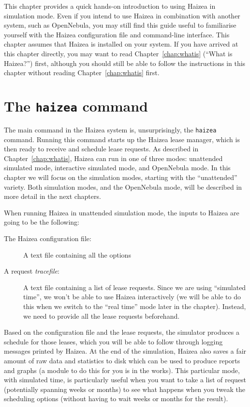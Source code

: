 This chapter provides a quick hands-on introduction to using Haizea in simulation mode. Even if you intend to use Haizea in combination with another system, such as OpenNebula, you may still find this guide useful to familiarise yourself with the Haizea configuration file and command-line interface. This chapter assumes that Haizea is installed on your system. If you have arrived at this chapter directly, you may want to read Chapter~\ref{chap:whatis} (``What is Haizea?'') first, although you should still be able to follow the instructions in this chapter without reading Chapter~\ref{chap:whatis} first.

\section{The \texttt{haizea} command}

The main command in the Haizea system is, unsurprisingly, the \texttt{haizea} command. Running this command starts up the Haizea lease manager, which is then ready to receive and schedule lease requests. As described in Chapter~\ref{chap:whatis}, Haizea can run in one of three modes: unattended simulated mode, interactive simulated mode, and OpenNebula mode. In this chapter we will focus on the simulation modes, starting with the ``unattended'' variety. Both simulation modes, and the OpenNebula mode, will be described in more detail in the next chapters.

When running Haizea in unattended simulation mode, the inputs to Haizea are going to be the following:

\begin{description}
 \item [The Haizea configuration file:] A text file containing all the options
 \item [A request \emph{tracefile}:] A text file containing a list of lease requests. Since we are using ``simulated time'', we won't be able to use Haizea interactively (we will be able to do this when we switch to the ``real time'' mode later in the chapter). Instead, we need to provide all the lease requests beforehand.
\end{description}

Based on the configuration file and the lease requests, the simulator produces a schedule for those leases, which you will be able to follow through logging messages printed by Haizea. At the end of the simulation, Haizea also saves a fair amount of raw data and statistics to disk which can be used to produce reports and graphs (a module to do this for you is in the works). This particular mode, with simulated time, is particularly useful when you want to take a list of request (potentially spanning weeks or months) to see what happens when you tweak the scheduling options (without having to wait weeks or months for the result).

